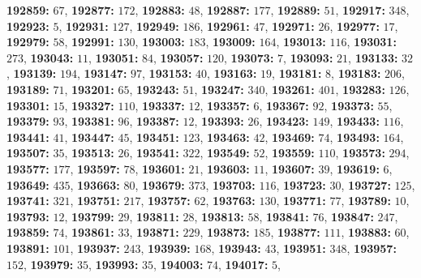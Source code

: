 \textsf{\bfseries 192859:} $67$, \textsf{\bfseries 192877:} $172$, \textsf{\bfseries 192883:} $48$, \textsf{\bfseries 192887:} $177$, \textsf{\bfseries 192889:} $51$, \textsf{\bfseries 192917:} $348$, \textsf{\bfseries 192923:} $5$, \textsf{\bfseries 192931:} $127$, \textsf{\bfseries 192949:} $186$, \textsf{\bfseries 192961:} $47$, \textsf{\bfseries 192971:} $26$, \textsf{\bfseries 192977:} $17$, \textsf{\bfseries 192979:} $58$, \textsf{\bfseries 192991:} $130$, \textsf{\bfseries 193003:} $183$, \textsf{\bfseries 193009:} $164$, \textsf{\bfseries 193013:} $116$, \textsf{\bfseries 193031:} $273$, \textsf{\bfseries 193043:} $11$, \textsf{\bfseries 193051:} $84$, \textsf{\bfseries 193057:} $120$, \textsf{\bfseries 193073:} $7$, \textsf{\bfseries 193093:} $21$, \textsf{\bfseries 193133:} $32$, \textsf{\bfseries 193139:} $194$, \textsf{\bfseries 193147:} $97$, \textsf{\bfseries 193153:} $40$, \textsf{\bfseries 193163:} $19$, \textsf{\bfseries 193181:} $8$, \textsf{\bfseries 193183:} $206$, \textsf{\bfseries 193189:} $71$, \textsf{\bfseries 193201:} $65$, \textsf{\bfseries 193243:} $51$, \textsf{\bfseries 193247:} $340$, \textsf{\bfseries 193261:} $401$, \textsf{\bfseries 193283:} $126$, \textsf{\bfseries 193301:} $15$, \textsf{\bfseries 193327:} $110$, \textsf{\bfseries 193337:} $12$, \textsf{\bfseries 193357:} $6$, \textsf{\bfseries 193367:} $92$, \textsf{\bfseries 193373:} $55$, \textsf{\bfseries 193379:} $93$, \textsf{\bfseries 193381:} $96$, \textsf{\bfseries 193387:} $12$, \textsf{\bfseries 193393:} $26$, \textsf{\bfseries 193423:} $149$, \textsf{\bfseries 193433:} $116$, \textsf{\bfseries 193441:} $41$, \textsf{\bfseries 193447:} $45$, \textsf{\bfseries 193451:} $123$, \textsf{\bfseries 193463:} $42$, \textsf{\bfseries 193469:} $74$, \textsf{\bfseries 193493:} $164$, \textsf{\bfseries 193507:} $35$, \textsf{\bfseries 193513:} $26$, \textsf{\bfseries 193541:} $322$, \textsf{\bfseries 193549:} $52$, \textsf{\bfseries 193559:} $110$, \textsf{\bfseries 193573:} $294$, \textsf{\bfseries 193577:} $177$, \textsf{\bfseries 193597:} $78$, \textsf{\bfseries 193601:} $21$, \textsf{\bfseries 193603:} $11$, \textsf{\bfseries 193607:} $39$, \textsf{\bfseries 193619:} $6$, \textsf{\bfseries 193649:} $435$, \textsf{\bfseries 193663:} $80$, \textsf{\bfseries 193679:} $373$, \textsf{\bfseries 193703:} $116$, \textsf{\bfseries 193723:} $30$, \textsf{\bfseries 193727:} $125$, \textsf{\bfseries 193741:} $321$, \textsf{\bfseries 193751:} $217$, \textsf{\bfseries 193757:} $62$, \textsf{\bfseries 193763:} $130$, \textsf{\bfseries 193771:} $77$, \textsf{\bfseries 193789:} $10$, \textsf{\bfseries 193793:} $12$, \textsf{\bfseries 193799:} $29$, \textsf{\bfseries 193811:} $28$, \textsf{\bfseries 193813:} $58$, \textsf{\bfseries 193841:} $76$, \textsf{\bfseries 193847:} $247$, \textsf{\bfseries 193859:} $74$, \textsf{\bfseries 193861:} $33$, \textsf{\bfseries 193871:} $229$, \textsf{\bfseries 193873:} $185$, \textsf{\bfseries 193877:} $111$, \textsf{\bfseries 193883:} $60$, \textsf{\bfseries 193891:} $101$, \textsf{\bfseries 193937:} $243$, \textsf{\bfseries 193939:} $168$, \textsf{\bfseries 193943:} $43$, \textsf{\bfseries 193951:} $348$, \textsf{\bfseries 193957:} $152$, \textsf{\bfseries 193979:} $35$, \textsf{\bfseries 193993:} $35$, \textsf{\bfseries 194003:} $74$, \textsf{\bfseries 194017:} $5$, 
